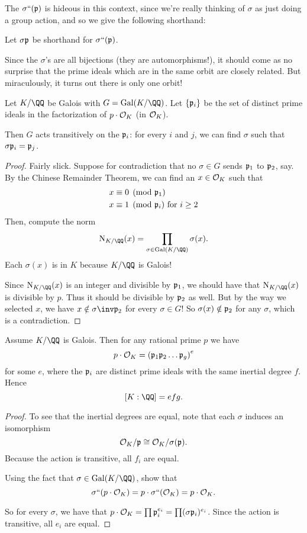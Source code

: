 The $\sigma``(\mathfrak p)$ is hideous in this context, since we're really thinking
of $\sigma$ as just doing a group action, and so we give the following shorthand:
\begin{abuse}
	Let $\sigma\mathfrak p$ be shorthand for $\sigma``(\mathfrak p)$.
\end{abuse}

Since the $\sigma$'s are all bijections (they are automorphisms!),
it should come as no surprise that the prime ideals which are in the same
orbit are closely related.
But miraculously, it turns out there is only one orbit!
\begin{theorem}
	Let $K/\QQ$ be Galois with $G = \Gal(K/\QQ)$.
	Let $\{\mathfrak p_i\}$ be the set of distinct prime ideals in
	the factorization of $p \cdot \mathcal O_K$ (in $\mathcal O_K$).

	Then $G$ acts transitively on the $\mathfrak p_i$:
	for every $i$ and $j$, we can find $\sigma$ such that $\sigma\mathfrak p_i = \mathfrak p_j$.
\end{theorem}
\begin{proof}
	Fairly slick.
	Suppose for contradiction that no $\sigma \in G$ sends $\mathfrak p_1$ to $\mathfrak p_2$, say.
	By the Chinese Remainder Theorem, we can find an $x \in \mathcal O_K$ such that
	\begin{align*}
		x &\equiv 0 \pmod{\mathfrak p_1} \\
		x &\equiv 1 \pmod{\mathfrak p_i} \text{ for $i \ge 2$}
	\end{align*}
	Then, compute the norm
	\[ \NK(x) = \prod_{\sigma \in \Gal(K/\QQ)} \sigma(x). \]
	Each $\sigma(x)$ is in $K$ because $K/\QQ$ is Galois!

	Since $\NK(x)$ is an integer and divisible by $\mathfrak p_1$,
	we should have that $\NK(x)$ is divisible by $p$.
	Thus it should be divisible by $\mathfrak p_2$ as well.
	But by the way we selected $x$, we have $x \notin \sigma\inv\pp_2$ for every $\sigma \in G$!
	So $\sigma(x) \notin \mathfrak p_2$ for any $\sigma$, which is a contradiction.
\end{proof}
\begin{theorem}
	Assume $K/\QQ$ is Galois.
	Then for any rational prime $p$ we have
	\[ p \cdot \mathcal O_K = \left( \mathfrak p_1 \mathfrak p_2 \dots \mathfrak p_g \right)^e \]
	for some $e$, where the $\mathfrak p_i$ are distinct prime ideals
	with the same inertial degree $f$.
	Hence \[ [K:\QQ] = efg. \]
\end{theorem}
\begin{proof}
	To see that the inertial degrees are equal, note that each $\sigma$
	induces an isomorphism
	\[ \mathcal O_K / \mathfrak p \cong \mathcal O_K / \sigma(\mathfrak p). \]
	Because the action is transitive, all $f_i$ are equal.
	\begin{exercise}
		Using the fact that $\sigma \in \Gal(K/\QQ)$,
		show that \[ \sigma``(p \cdot \mathcal O_K) = p \cdot \sigma``(\mathcal O_K) = p \cdot \mathcal O_K. \]
	\end{exercise}
	So for every $\sigma$, we have that
	$p \cdot \mathcal O_K = \prod \mathfrak p_i^{e_i} = \prod (\sigma\mathfrak p_i)^{e_i}$.
	Since the action is transitive, all $e_i$ are equal.
\end{proof}

